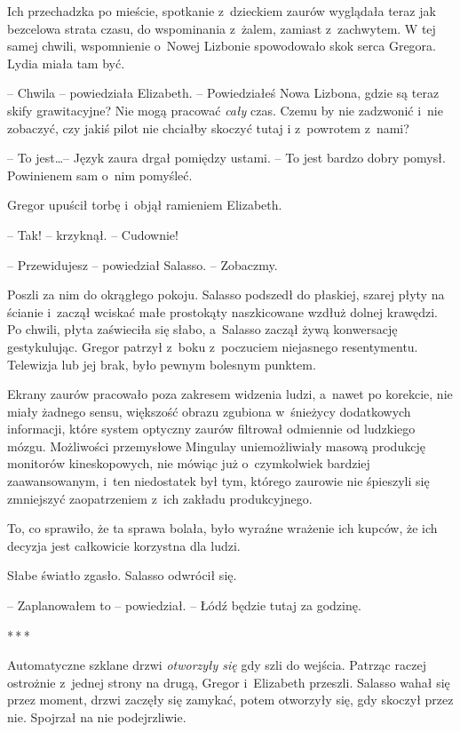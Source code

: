 \documentclass[oneside,polish,12pt,sfheadings]{mwbk}
\newcommand{\threeast}{\bigskip\par\centerline{*\,*\,*}\medskip\par}%
\begin{document}
Ich przechadzka po mieście, spotkanie z~dzieckiem zaurów wyglądała teraz
jak bezcelowa strata czasu, do wspominania z~żalem, zamiast z~zachwytem.
W tej samej chwili, wspomnienie o~Nowej Lizbonie spowodowało skok serca
Gregora. Lydia miała tam być.

-- Chwila -- powiedziała Elizabeth. -- Powiedziałeś Nowa Lizbona, gdzie są
teraz skify grawitacyjne? Nie mogą pracować \emph{cały} czas. Czemu by
nie zadzwonić i~nie zobaczyć, czy jakiś pilot nie chciałby skoczyć tutaj
i z~powrotem z~nami?

-- To jest\ldots -- Język zaura drgał pomiędzy ustami. -- To jest bardzo dobry
pomysł. Powinienem sam o~nim pomyśleć.

Gregor upuścił torbę i~objął ramieniem Elizabeth.

-- Tak! -- krzyknął. -- Cudownie!

-- Przewidujesz -- powiedział Salasso. -- Zobaczmy.

Poszli za nim do okrągłego pokoju. Salasso podszedł do płaskiej, szarej
płyty na ścianie i~zaczął wciskać małe prostokąty naszkicowane wzdłuż
dolnej krawędzi. Po chwili, płyta zaświeciła się słabo, a~Salasso zaczął
żywą konwersację gestykulując. Gregor patrzył z~boku z~poczuciem
niejasnego resentymentu. Telewizja lub jej brak, było pewnym bolesnym
punktem.

Ekrany zaurów pracowało poza zakresem widzenia ludzi, a~nawet po
korekcie, nie miały żadnego sensu, większość obrazu zgubiona w~śnieżycy
dodatkowych informacji, które system optyczny zaurów filtrował odmiennie
od ludzkiego mózgu. Możliwości przemysłowe Mingulay uniemożliwiały
masową produkcję monitorów kineskopowych, nie mówiąc już o~czymkolwiek
bardziej zaawansowanym, i~ten niedostatek był tym, którego zaurowie nie
śpieszyli się zmniejszyć zaopatrzeniem z~ich zakładu produkcyjnego.

To, co sprawiło, że ta sprawa bolała, było wyraźne wrażenie ich kupców,
że ich decyzja jest całkowicie korzystna dla ludzi.

Słabe światło zgasło. Salasso odwrócił się.

-- Zaplanowałem to -- powiedział. -- Łódź będzie tutaj za godzinę.

\threeast

Automatyczne szklane drzwi \emph{otworzyły się} gdy szli do wejścia.
Patrząc raczej ostrożnie z~jednej strony na drugą, Gregor i~Elizabeth
przeszli. Salasso wahał się przez moment, drzwi zaczęły się zamykać,
potem otworzyły się, gdy skoczył przez nie. Spojrzał na nie
podejrzliwie.
\end{document}

